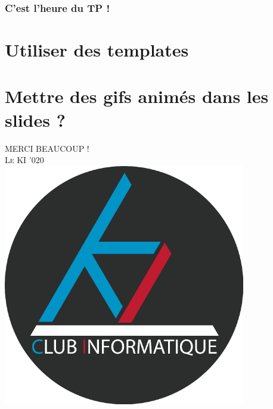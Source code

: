\documentclass[handout]{beamer}
\begin{document}
\begin{frame}
	\frametitle{C'est l'heure du TP !}

\end{frame}

\section{Utiliser des templates}

\section{Mettre des gifs animés dans les slides ?}

\begin{frame}
	\centering
	\Huge
	\textsc{MERCI BEAUCOUP !}\\
	\vspace*{2cm}
	\normalsize
	\textsc{Le KI '020}\\
	\vspace*{1cm}
	\centering
	\includegraphics[scale=0.2]{logo-ki.png}
\end{frame}
\end{document}
